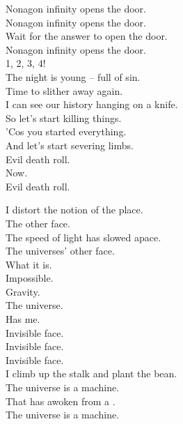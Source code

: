 Nonagon infinity opens the door. \\
Nonagon infinity opens the door. \\
Wait for the answer to open the door. \\
Nonagon infinity opens the door. \\

1, 2, 3, 4! \\

The night is young -- full of sin. \\
Time to slither away again. \\
I can see our history hanging on a knife. \\

So let's start killing things. \\
'Cos you started everything. \\
And let's start severing limbs. \\

Evil death roll. \\
Now. \\
Evil death roll. \\




I distort the notion of the place. \\
The  other face. \\
The speed of light has slowed apace. \\
The universes' other face. \\

What it is. \\
Impossible. \\
Gravity. \\
The universe. \\
Has me. \\
Invisible face. \\

Invisible face. \\
Invisible face. \\

I climb up the stalk and plant the bean. \\
The universe is a machine. \\
That has awoken from a . \\
The universe is a machine. \\

